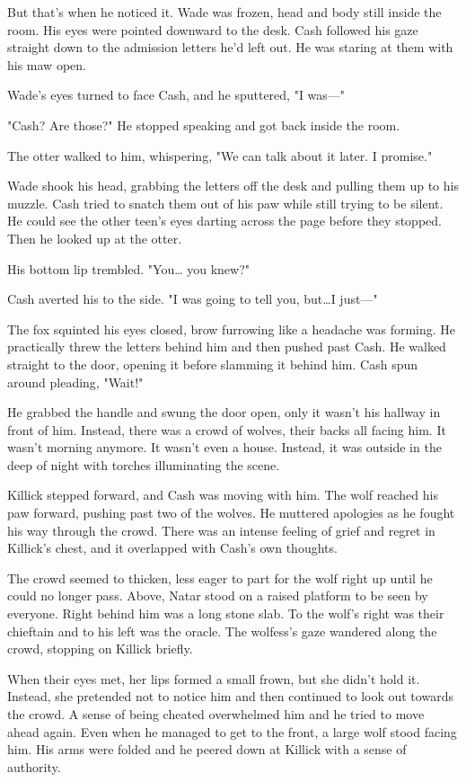 But that's when he noticed it. Wade was frozen, head and body still inside the room. His eyes were pointed downward to the desk. Cash followed his gaze straight down to the admission letters he'd left out. He was staring at them with his maw open.

Wade's eyes turned to face Cash, and he sputtered, "I was---"

"Cash? Are those?" He stopped speaking and got back inside the room.

The otter walked to him, whispering, "We can talk about it later. I promise."

Wade shook his head, grabbing the letters off the desk and pulling them up to his muzzle. Cash tried to snatch them out of his paw while still trying to be silent. He could see the other teen's eyes darting across the page before they stopped. Then he looked up at the otter.

His bottom lip trembled. "You\ldots{} you knew?"

Cash averted his to the side. "I was going to tell you, but\ldots I just---"

The fox squinted his eyes closed, brow furrowing like a headache was forming. He practically threw the letters behind him and then pushed past Cash. He walked straight to the door, opening it before slamming it behind him. Cash spun around pleading, "Wait!"

He grabbed the handle and swung the door open, only it wasn't his hallway in front of him. Instead, there was a crowd of wolves, their backs all facing him. It wasn't morning anymore. It wasn't even a house. Instead, it was outside in the deep of night with torches illuminating the scene.

Killick stepped forward, and Cash was moving with him. The wolf reached his paw forward, pushing past two of the wolves. He muttered apologies as he fought his way through the crowd. There was an intense feeling of grief and regret in Killick's chest, and it overlapped with Cash's own thoughts.

The crowd seemed to thicken, less eager to part for the wolf right up until he could no longer pass. Above, Natar stood on a raised platform to be seen by everyone. Right behind him was a long stone slab. To the wolf's right was their chieftain and to his left was the oracle. The wolfess's gaze wandered along the crowd, stopping on Killick briefly.

When their eyes met, her lips formed a small frown, but she didn't hold it. Instead, she pretended not to notice him and then continued to look out towards the crowd. A sense of being cheated overwhelmed him and he tried to move ahead again. Even when he managed to get to the front, a large wolf stood facing him. His arms were folded and he peered down at Killick with a sense of authority.

